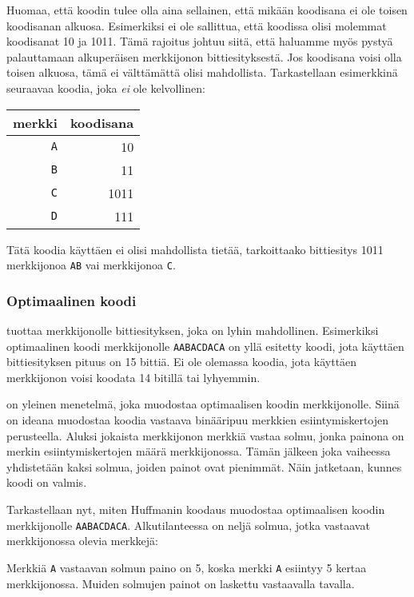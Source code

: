 Huomaa, että koodin tulee olla aina sellainen,
että mikään koodisana ei ole toisen koodisanan
alkuosa.
Esimerkiksi ei ole sallittua, että koodissa
olisi molemmat koodisanat 10 ja 1011.
Tämä rajoitus johtuu siitä,
että haluamme myös pystyä palauttamaan
alkuperäisen merkkijonon bittiesityksestä.
Jos koodisana voisi olla toisen alkuosa,
tämä ei välttämättä olisi mahdollista.
Tarkastellaan esimerkkinä seuraavaa koodia,
joka \emph{ei} ole kelvollinen:
\begin{center}
\begin{tabular}{rr}
merkki & koodisana \\
\hline
\texttt{A} & 10 \\
\texttt{B} & 11 \\
\texttt{C} & 1011 \\
\texttt{D} & 111 \\
\end{tabular}
\end{center}
Tätä koodia käyttäen ei olisi mahdollista tietää,
tarkoittaako bittiesitys 1011
merkkijonoa \texttt{AB} vai merkkijonoa \texttt{C}.

\subsubsection{Optimaalinen koodi}

 tuottaa
merkkijonolle bittiesityksen,
joka on lyhin mahdollinen.
Esimerkiksi optimaalinen koodi
merkkijonolle \texttt{AABACDACA} on
yllä esitetty koodi,
jota käyttäen bittiesityksen pituus on 15 bittiä.
Ei ole olemassa koodia,
jota käyttäen merkkijonon voisi koodata
14 bitillä tai lyhyemmin.

 on yleinen menetelmä,
joka muodostaa optimaalisen koodin merkkijonolle.
Siinä on ideana muodostaa koodia vastaava binääripuu
merkkien esiintymiskertojen perusteella.
Aluksi jokaista merkkijonon merkkiä vastaa solmu,
jonka painona on merkin esiintymiskertojen määrä merkkijonossa.
Tämän jälkeen joka vaiheessa yhdistetään kaksi solmua,
joiden painot ovat pienimmät.
Näin jatketaan, kunnes koodi on valmis.

Tarkastellaan nyt, miten Huffmanin koodaus
muodostaa optimaalisen koodin merkkijonolle
\texttt{AABACDACA}.
Alkutilanteessa on neljä solmua,
jotka vastaavat merkkijonossa olevia merkkejä:

\begin{center}
\end{center}
Merkkiä \texttt{A} vastaavan solmun paino on
5, koska merkki \texttt{A} esiintyy 5 kertaa merkkijonossa.
Muiden solmujen painot on laskettu vastaavalla tavalla.

